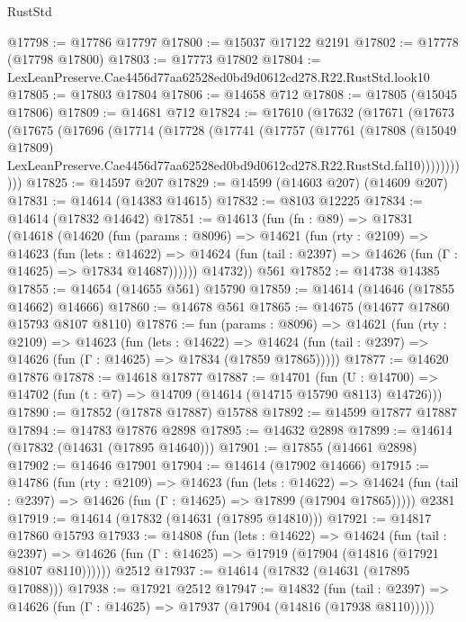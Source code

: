 \begin{lexlean}{RustStd}
\begin{coremodule}
@17798 := @17786 @17797
@17800 := @15037 @17122 @2191
@17802 := @17778 (@17798 @17800)
@17803 := @17773 @17802
@17804 := LexLeanPreserve.Cae4456d77aa62528ed0bd9d0612cd278.R22.RustStd.look10
@17805 := @17803 @17804
@17806 := @14658 @712
@17808 := @17805 (@15045 @17806)
@17809 := @14681 @712
@17824 := @17610
    (@17632
      (@17671
        (@17673
          (@17675
            (@17696
              (@17714
                (@17728
                  (@17741
                    (@17757
                      (@17761
                        (@17808
                          (@15049 @17809)
                          LexLeanPreserve.Cae4456d77aa62528ed0bd9d0612cd278.R22.RustStd.fal10)))))))))))
@17825 := @14597 @207
@17829 := @14599 (@14603 @207) (@14609 @207)
@17831 := @14614 (@14383 @14615)
@17832 := @8103 @12225
@17834 := @14614 (@17832 @14642)
@17851 := @14613
    (fun (fn : @89) =>
    @17831
      (@14618
        (@14620
          (fun (params : @8096) =>
          @14621
            (fun (rty : @2109) =>
            @14623
              (fun (lets : @14622) =>
              @14624 (fun (tail : @2397) => @14626 (fun (Γ : @14625) => @17834 @14687))))))
        @14732))
    @561
@17852 := @14738 @14385
@17855 := @14654 (@14655 @561) @15790
@17859 := @14614 (@14646 (@17855 @14662) @14666)
@17860 := @14678 @561
@17865 := @14675 (@14677 @17860 @15793 @8107 @8110)
@17876 := fun (params : @8096) =>
  @14621
    (fun (rty : @2109) =>
    @14623
      (fun (lets : @14622) =>
      @14624 (fun (tail : @2397) => @14626 (fun (Γ : @14625) => @17834 (@17859 @17865)))))
@17877 := @14620 @17876
@17878 := @14618 @17877
@17887 := @14701
    (fun (U : @14700) => @14702 (fun (t : @7) => @14709 (@14614 (@14715 @15790 @8113) @14726)))
@17890 := @17852 (@17878 @17887) @15788
@17892 := @14599 @17877 @17887
@17894 := @14783 @17876 @2898
@17895 := @14632 @2898
@17899 := @14614 (@17832 (@14631 (@17895 @14640)))
@17901 := @17855 (@14661 @2898)
@17902 := @14646 @17901
@17904 := @14614 (@17902 @14666)
@17915 := @14786
    (fun (rty : @2109) =>
    @14623
      (fun (lets : @14622) =>
      @14624 (fun (tail : @2397) => @14626 (fun (Γ : @14625) => @17899 (@17904 @17865)))))
    @2381
@17919 := @14614 (@17832 (@14631 (@17895 @14810)))
@17921 := @14817 @17860 @15793
@17933 := @14808
    (fun (lets : @14622) =>
    @14624
      (fun (tail : @2397) =>
      @14626 (fun (Γ : @14625) => @17919 (@17904 (@14816 (@17921 @8107 @8110))))))
    @2512
@17937 := @14614 (@17832 (@14631 (@17895 @17088)))
@17938 := @17921 @2512
@17947 := @14832
    (fun (tail : @2397) => @14626 (fun (Γ : @14625) => @17937 (@17904 (@14816 (@17938 @8110)))))

\end{coremodule}
\end{lexlean}
